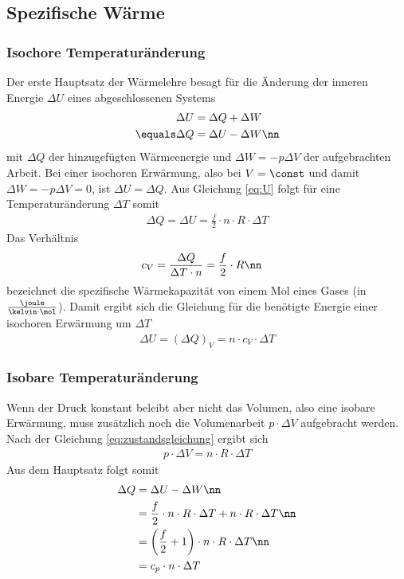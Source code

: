 \documentclass[12pt, a4paper, twoside]{scrartcl}
\begin{document}
\subsection{Spezifische Wärme}
\subsubsection*{Isochore Temperaturänderung}
Der erste Hauptsatz der Wärmelehre besagt für die Änderung der inneren Energie $\Delta U$ eines abgeschlossenen Systems
\begin{align}
 \Delta U &= \Delta Q + \Delta W \label{eq:HS} \\
\equals \Delta Q &= \Delta U - \Delta W \nn 
\end{align}
mit $\Delta Q$ der hinzugefügten Wärmeenergie und $\Delta W = -p \Delta V$ der aufgebrachten Arbeit.
Bei einer isochoren Erwärmung, also bei $V = \const$ und damit $\Delta W = -p \Delta V = 0$, ist $\Delta U = \Delta Q$.
Aus Gleichung \eqref{eq:U} folgt für eine Temperaturänderung $\Delta T$ somit
\begin{align}
 \Delta Q = \Delta U = \frac{f}{2}\cdot n \cdot R \cdot \Delta T \label{eq:1}
\end{align}
Das Verhältnis
\begin{align}
 c_V &= \frac{\Delta Q}{\Delta T \cdot n} = \frac{f}{2} \cdot R \nn
\end{align}
bezeichnet die spezifische Wärmekapazität von einem Mol eines Gases (in $\frac{\joule}{\kelvin\cdot\mol}$).
Damit ergibt sich die Gleichung für die benötigte Energie einer isochoren Erwärmung um $\Delta T$
\begin{align}
 \Delta U = \left(\Delta Q\right)_V = n\cdot c_V \cdot \Delta T \label{eq:dU_V}
\end{align}

\subsubsection*{Isobare Temperaturänderung}
Wenn der Druck konstant beleibt aber nicht das Volumen, also eine isobare Erwärmung, muss zusätzlich noch die Volumenarbeit $p \cdot\Delta V$ aufgebracht werden.
Nach der Gleichung \eqref{eq:zustandsgleichung} ergibt sich
\begin{align}
 p\cdot\Delta V = n\cdot R\cdot \Delta T
\end{align}
Aus dem Hauptsatz folgt somit
\begin{align}
 \Delta Q &= \Delta U - \Delta W \nn\\
          &= \frac{f}{2} \cdot n\cdot R\cdot \Delta T + n\cdot R\cdot \Delta T \nn\\
          &= \left(\frac{f}{2}+1\right) \cdot n\cdot R\cdot \Delta T \nn\\
          &= c_p \cdot n\cdot \Delta T
\end{align}
\end{document}
